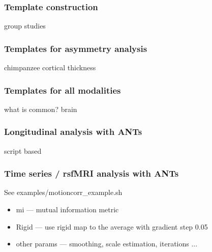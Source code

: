 \documentclass[18pt]{beamer}
\begin{document}
\begin{frame}
\frametitle{Template construction}
group studies 
\end{frame}

\begin{frame}
\frametitle{Templates for asymmetry analysis}
chimpanzee cortical thickness 
\end{frame}

\begin{frame}
\frametitle{Templates for all modalities}
what is common?  brain
\end{frame}

\begin{frame}
\frametitle{Longitudinal analysis with ANTs}
script based 
\end{frame} 

\begin{frame}
\frametitle{Time series / rsfMRI analysis with ANTs}
See  examples/motioncorr\_example.sh

\begin{itemize}
\item mi --- mutual information metric 
\pause
\item Rigid --- use rigid map to the average with gradient step 0.05
\pause
\item other params --- smoothing, scale estimation, iterations ... 
\end{itemize}
\end{frame}
\end{document}
